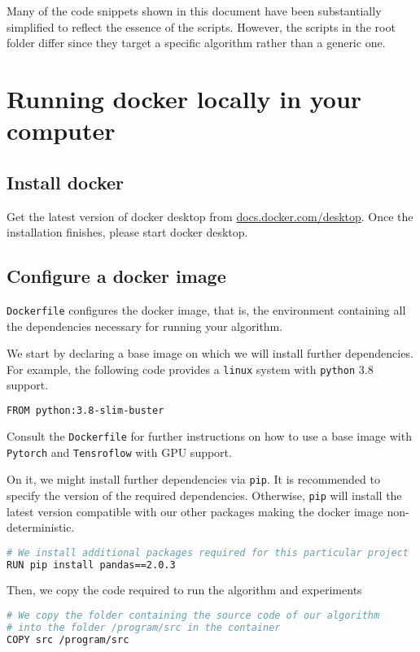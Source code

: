 \documentclass[12pt, letterpaper, onecolumn]{article}
\begin{document}
Many of the code snippets shown in this document have been substantially simplified to reflect the essence of the scripts. However, the scripts in the root folder differ since they target a specific algorithm rather than a generic one. 

\pagebreak

\section{Running docker locally in your computer}

\subsection{Install docker}

Get the latest version of docker desktop from \href{https://docs.docker.com/desktop/}{docs.docker.com/desktop}. Once the installation finishes, please start docker desktop.

\subsection{Configure a docker image}

\texttt{Dockerfile} configures the docker image, that is, the environment containing all the dependencies necessary for running your algorithm. 

We start by declaring a base image on which we will install further dependencies. For example, the following code provides a \texttt{linux} system with \texttt{python} 3.8 support. \begin{lstlisting}[language=Bash]
FROM python:3.8-slim-buster
\end{lstlisting} Consult the \texttt{Dockerfile} for further instructions on how to use a base image with \texttt{Pytorch} and \texttt{Tensroflow} with GPU support.

On it, we might install further dependencies via \texttt{pip}. It is recommended to specify the version of the required dependencies. Otherwise, \texttt{pip} will install the latest version compatible with our other packages making the docker image non-deterministic. \begin{lstlisting}[language=Bash]
# We install additional packages required for this particular project
RUN pip install pandas==2.0.3
\end{lstlisting}  

Then, we copy the code required to run the algorithm and experiments \begin{lstlisting}[language=Bash]
# We copy the folder containing the source code of our algorithm 
# into the folder /program/src in the container
COPY src /program/src
\end{lstlisting}  
\end{document}
